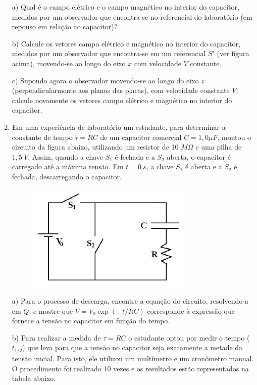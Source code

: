 \begin{enumerate}[start=1,label={\bfseries Q\arabic*.}]
a) Qual é o campo elétrico e o campo magnético no interior do capacitor, medidos por um observador que encontra-se no referencial do laboratório (em repouso em relação ao capacitor)?

\resposta

b) Calcule os vetores campo elétrico e magnético no interior do capacitor, medidos por um observador que encontra-se em um referencial $S'$ (ver figura acima), movendo-se ao longo do eixo $x$ com velocidade $V$ constante.

\resposta

c) Supondo agora o observador movendo-se ao longo do eixo $z$ (perpendicularmente aos planos das placas), com velocidade constante $V$, calcule novamente os vetores campo elétrico e magnético no interior do capacitor.

\resposta


\item Em uma experiência de laboratório um estudante, para determinar a constante de tempo $\tau = RC$ de um capacitor comercial $C = 1,0 \mu F$, montou o circuito da figura abaixo, utilizando um resistor de 10 $M \Omega$ e uma pilha de $1,5 \ V$. Assim, quando a chave $S_{1}$ é fechada e a $S_{2}$ aberta, o capacitor é carregado até a máxima tensão. Em $t = 0 \ s$, a chave $S_{1}$ é aberta e a $S_{2}$ é fechada, descarregando o capacitor.
\begin{figure}[H]
\centering
\includegraphics[scale=0.7]{eletromag-img/circuito.png}
\end{figure}

a) Para o processo de descarga, encontre a equação do circuito, resolvendo-a em $Q$, e mostre que $V = V_{0} \operatorname{exp}(-t/RC)$ corresponde à expressão que fornece a tensão no capacitor em função do tempo.

\resposta

b) Para realizar a medida de $\tau = RC$ o estudante optou por medir o tempo ($t_{1/2}$) que leva para que a tensão no capacitor seja exatamente a metade da tensão inicial. Para isto, ele utilizou um multímetro e um cronômetro manual. O procedimento foi realizado 10 vezes e os resultados estão representados na tabela abaixo.


\end{enumerate}
